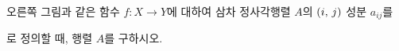 \hspace*{2mm}\begin{minipage}[t]{\dimexpr\linewidth-2mm\relax}\vspace{0pt}
\noindent\begin{minipage}[t]{0.58\linewidth}\vspace{0pt}\raggedright 오른쪽 그림과 같은 함수 $f:X\longrightarrow Y$에 대하여 삼차 정사각행렬 $A$의 $(i,\mkern3mu j)$ 성분 $a_{ij}$를\par\smallskip\end{minipage}\hfill\begin{minipage}[t]{0.4\linewidth}\vspace{0pt}\centering \resizebox{\ifdim\width>\linewidth\linewidth\else\width\fi}{!}{}\end{minipage}\par
\noindent {}\par\smallskip\noindent 로 정의할 때, 행렬 $A$를 구하시오.\end{minipage}
